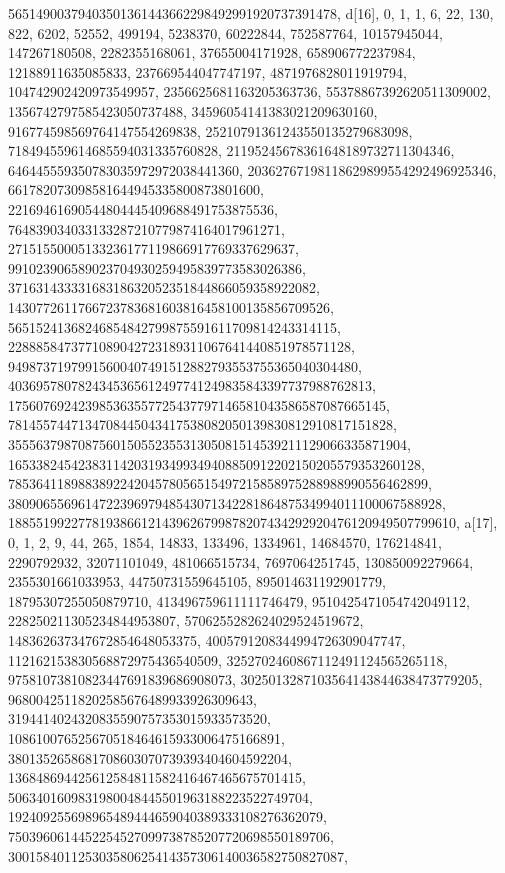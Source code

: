 {{{   56514900379403501361443662298492991920737391478}}, 
 {d[16], {0, 1, 1, 6, 22, 130, 822, 6202, 52552, 499194, 5238370, 60222844, 
   752587764, 10157945044, 147267180508, 2282355168061, 37655004171928, 
   658906772237984, 12188911635085833, 237669544047747197, 
   4871976828011919794, 104742902420973549957, 2356625681163205363736, 
   55378867392620511309002, 1356742797585423050737488, 
   34596054141383021209630160, 916774598569764147554269838, 
   25210791361243550135279683098, 718494559614685594031335760828, 
   21195245678361648189732711304346, 646445559350783035972972038441360, 
   20362767198118629899554292496925346, 661782073098581644945335800873801600, 
   22169461690544804445409688491753875536, 
   764839034033133287210779874164017961271, 
   27151550005133236177119866917769337629637, 
   991023906589023704930259495839773583026386, 
   37163143333168318632052351844866059358922082, 
   1430772611766723783681603816458100135856709526, 
   56515241368246854842799875591611709814243314115, 
   2288858473771089042723189311067641440851978571128, 
   94987371979915600407491512882793553755365040304480, 
   4036957807824345365612497741249835843397737988762813, 
   175607692423985363557725437797146581043586587087665145, 
   7814557447134708445043417538082050139830812910817151828, 
   355563798708756015055235531305081514539211129066335871904, 
   16533824542383114203193499349408850912202150205579353260128, 
   785364118988389224204578056515497215858975288988990556462899, 
   38090655696147223969794854307134228186487534994011100067588928, 
   1885519922778193866121439626799878207434292920476120949507799610}}, 
 {a[17], {0, 1, 2, 9, 44, 265, 1854, 14833, 133496, 1334961, 14684570, 
   176214841, 2290792932, 32071101049, 481066515734, 7697064251745, 
   130850092279664, 2355301661033953, 44750731559645105, 895014631192901779, 
   18795307255050879710, 413496759611111746479, 9510425471054742049112, 
   228250211305234844953807, 5706255282624029524519672, 
   148362637347672854648053375, 4005791208344994726309047747, 
   112162153830568872975436540509, 3252702460867112491124565265118, 
   97581073810823447691839686908073, 3025013287103564143844638473779205, 
   96800425118202585676489933926309643, 
   3194414024320835590757353015933573520, 
   108610076525670518464615933006475166891, 
   3801352658681708603070739393404604592204, 
   136848694425612584811582416467465675701415, 
   5063401609831980048445501963188223522749704, 
   192409255698965489444659040389333108276362079, 
   7503960614452254527099738785207720698550189706, 
   300158401125303580625414357306140036582750827087}}, 
}
